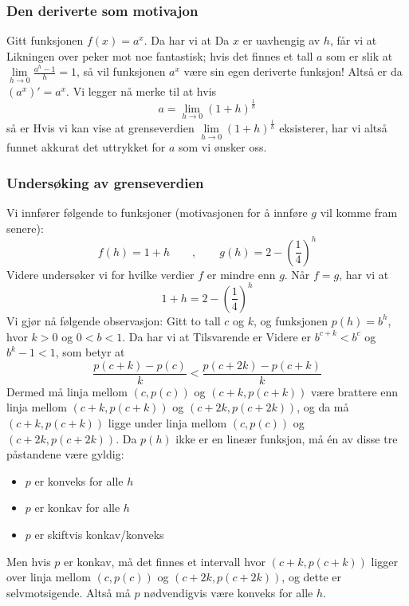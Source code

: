 



	
 \label{eulerstallfork}
\subsubsection{Den deriverte som motivajon}
Gitt funksjonen $ f(x)=a^x $. Da har vi at
Da $ x $ er uavhengig av $ h $, får vi at
Likningen over peker mot noe fantastisk; hvis det finnes et tall $ a $ som er slik at $ {\lim\limits_{h\to 0}\frac{a^h-1}{h}=1} $, så vil funksjonen $ a^x $ være sin egen deriverte funksjon! Altså er da $ \left(a^x\right)'=a^x $. Vi legger nå merke til at hvis
\[ a=\lim\limits_{h\to 0}\left(1+h\right)^\frac{1}{h} \]
så er 
Hvis vi kan vise at grenseverdien $ \lim\limits_{h\to 0}\left(1+h\right)^\frac{1}{h} $ eksisterer, har vi altså funnet akkurat det uttrykket for $ a $ som vi ønsker oss.

\subsubsection{Undersøking av grenseverdien}
Vi innfører følgende to funksjoner (motivasjonen for å innføre $ g $ vil komme fram senere):
\[ f(h)=1+h \qquad,\qquad g(h)=2-\left(\frac{1}{4}\right)^{h}\]
Videre undersøker vi for hvilke verdier $ f $ er mindre enn  $ g $. Når $ f=g $, har vi at
\begin{equation}\label{eforkleqh}
	1+h=2-\left(\frac{1}{4}\right)^h 
\end{equation}
Vi gjør nå følgende observasjon: Gitt to tall $ c $ og $ k $, og funksjonen $ p(h)=b^h $, hvor $ k>0 $ og $ 0<b<1 $. Da har vi at
Tilsvarende er
Videre er $ b^{c+k}<b^c $ og $ b^k-1<1 $, som betyr at
\[ \frac{p(c+k)-p(c)}{k}<\frac{p(c+2k)-p(c+k)}{k} \]
Dermed må linja mellom $ (c, p(c)) $ og $ (c+k, p(c+k)) $ være brattere enn linja mellom $ (c+k, p(c+k)) $ og $ (c+2k, p(c+2k)) $, og da må $ (c+k, p(c+k)) $ ligge under linja mellom $ (c, p(c)) $ og $ (c+2k, p(c+2k)) $.
Da $ p(h) $ ikke er en lineær funksjon, må én av disse tre påstandene være gyldig:
\begin{itemize}
	\item $ p $ er konveks for alle $ h$
	\item $ p $ er konkav for alle $ h $
	\item $ p $ er skiftvis konkav/konveks
\end{itemize}
Men hvis $ p $ er konkav, må det finnes et intervall hvor $ (c+k, p(c+k)) $ ligger over linja mellom $ (c, p(c)) $ og $ (c+2k, p(c+2k)) $, og dette er selvmotsigende. Altså må $ p $ nødvendigvis være konveks for alle $ h $.\vsk

